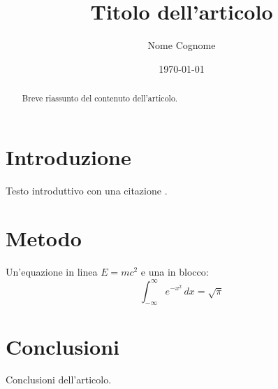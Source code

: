 \documentclass[11pt,a4paper]{article}
\title{Titolo dell'articolo}
\author{Nome Cognome}
\date{\today}
\begin{document}
\maketitle

\begin{abstract}
Breve riassunto del contenuto dell'articolo.
\end{abstract}

\section{Introduzione}
Testo introduttivo con una citazione \cite{knuth1986}.

\section{Metodo}
Un'equazione in linea $E = mc^2$ e una in blocco:
\begin{equation}
  \int_{-\infty}^{\infty} e^{-x^2}\,dx = \sqrt{\pi}
\end{equation}

\section{Conclusioni}
Conclusioni dell'articolo.



\end{document}
